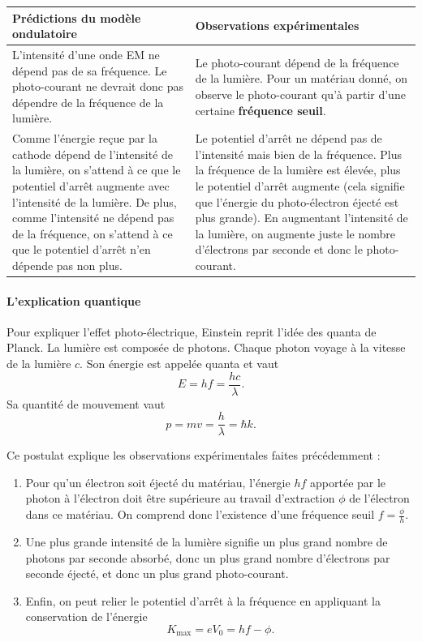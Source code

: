 \begin{tabular}{p{}|p{}}
	\textbf{Prédictions du modèle ondulatoire} & \textbf{Observations expérimentales} \\
	\hline
	L'intensité d'une onde EM ne dépend pas de sa fréquence. Le photo-courant
	ne devrait donc pas dépendre de la fréquence de la lumière.
	& Le photo-courant dépend de la fréquence de la lumière. Pour un
	matériau donné, on observe le photo-courant qu'à partir d'une
	certaine \textbf{fréquence seuil}. \\
	\hline
	Comme l'énergie reçue par la cathode dépend de l'intensité de la lumière,
	on s'attend à ce que le potentiel d'arrêt augmente avec l'intensité
	de la lumière. De plus, comme l'intensité ne dépend pas de la fréquence,
	on s'attend à ce que le potentiel d'arrêt n'en dépende pas non plus.
	& Le potentiel d'arrêt ne dépend pas de l'intensité mais bien de la
	fréquence. Plus la fréquence de la lumière est élevée, plus le potentiel
	d'arrêt augmente (cela signifie que l'énergie du photo-électron éjecté
	est plus grande). En augmentant l'intensité de la lumière, on augmente juste
	le nombre d'électrons par seconde et donc le photo-courant.
\end{tabular}

\paragraph{L'explication quantique}
Pour expliquer l'effet photo-électrique, Einstein
reprit l'idée des quanta de Planck.
La lumière est composée de photons.
Chaque photon voyage à la vitesse de la lumière $c$.
Son énergie est appelée quanta et vaut
\[ E = hf = \frac{hc}{\lambda} .\]
Sa quantité de mouvement vaut
\[ p = mv = \frac{h}{\lambda} = \hbar k. \]

Ce postulat explique les observations expérimentales
faites précédemment :
\begin{enumerate}
	\item	Pour qu'un électron soit éjecté du matériau,
	l'énergie $hf$ apportée par le photon à
	l'électron doit être supérieure au travail d'extraction
	$\phi$ de l'électron dans ce matériau. On comprend donc
	l'existence d'une fréquence seuil $f = \frac{\phi}{h}$.
	\item Une plus grande intensité de la lumière signifie
	un plus grand nombre de photons par seconde absorbé,
	donc un plus grand nombre d'électrons par seconde éjecté,
	et donc un plus grand photo-courant.
	\item Enfin, on peut relier le potentiel d'arrêt à la
	fréquence en appliquant la conservation de l'énergie
	\[ K_{\text{max}} = eV_0 = hf - \phi .\]
\end{enumerate}

